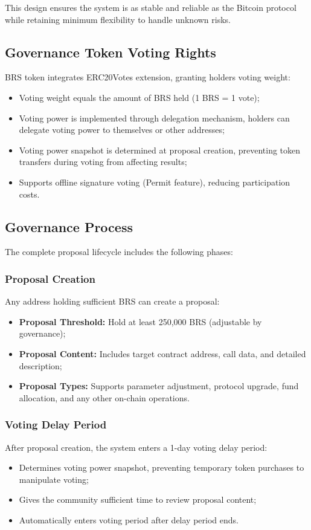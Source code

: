 \documentclass{article}
\begin{document}
This design ensures the system is as stable and reliable as the Bitcoin protocol while retaining minimum flexibility to handle unknown risks.

\subsection{Governance Token Voting Rights}

BRS token integrates ERC20Votes extension, granting holders voting weight:
\begin{itemize}
  \item Voting weight equals the amount of BRS held (1 BRS = 1 vote);
  \item Voting power is implemented through delegation mechanism, holders can delegate voting power to themselves or other addresses;
  \item Voting power snapshot is determined at proposal creation, preventing token transfers during voting from affecting results;
  \item Supports offline signature voting (Permit feature), reducing participation costs.
\end{itemize}

\subsection{Governance Process}

The complete proposal lifecycle includes the following phases:

\subsubsection{Proposal Creation}
Any address holding sufficient BRS can create a proposal:
\begin{itemize}
  \item \textbf{Proposal Threshold:} Hold at least 250,000 BRS (adjustable by governance);
  \item \textbf{Proposal Content:} Includes target contract address, call data, and detailed description;
  \item \textbf{Proposal Types:} Supports parameter adjustment, protocol upgrade, fund allocation, and any other on-chain operations.
\end{itemize}

\subsubsection{Voting Delay Period}
After proposal creation, the system enters a 1-day voting delay period:
\begin{itemize}
  \item Determines voting power snapshot, preventing temporary token purchases to manipulate voting;
  \item Gives the community sufficient time to review proposal content;
  \item Automatically enters voting period after delay period ends.
\end{itemize}
\end{document}
